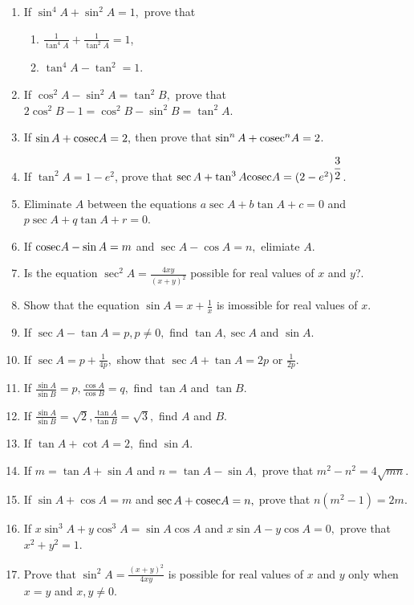 \begin{enumerate}
\item If $\sin^4 A + \sin^2 A = 1,$ prove that
  \begin{enumerate}
    \item $\frac{1}{\tan^4 A} + \frac{1}{\tan^2A} = 1$,
    \item $\tan^4A - \tan^2 = 1$.
  \end{enumerate}
\item If $\cos^2A - \sin^2 A = \tan^2 B,$ prove that $2\cos^2B - 1 = \cos^2B - \sin^2B = \tan^2A$.
\item If $\sin A + {\rm cosec} A = 2,$ then prove that $\sin^nA + {\rm cosec}^nA = 2$.
\item If $\tan^2A = 1 - e^2$, prove that $\sec A + \tan^3A {\rm cosec}A = (2 - e^2)^{\frac{3}{2}}$.
\item Eliminate $A$ between the equations $a\sec A + b\tan A + c = 0$ and $p\sec A + q\tan A + r = 0$.
\item If ${\rm cosec} A - \sin A = m$ and $\sec A - \cos A = n,$ elimiate $A$.
\item Is the equation $\sec^2 A = \frac{4xy}{(x + y)^2}$ possible for real values of $x$ and $y$?.
\item Show that the equation $\sin A = x + \frac{1}{x}$ is imossible for real values of $x$.
\item If $\sec A - \tan A = p, p\neq 0,$ find $\tan A, \sec A$ and $\sin A$.
\item If $\sec A = p + \frac{1}{4p},$ show that $\sec A + \tan A = 2p$ or $\frac{1}{2p}$.
\item If $\frac{\sin A}{\sin B} = p, \frac{\cos A}{\cos B} = q,$ find $\tan A$ and $\tan B$.
\item If $\frac{\sin A}{\sin B} = \sqrt{2}, \frac{\tan A}{\tan B}= \sqrt{3},$ find $A$ and $B$.
\item If $\tan A + \cot A = 2,$ find $\sin A$.
\item If $m = \tan A + \sin A$ and $n = \tan A - \sin A,$ prove that $m^2 - n^2 = 4\sqrt{mn}$.
\item If $\sin A + \cos A = m$ and $\sec A + {\rm cosec} A = n,$ prove that $n(m^2 - 1) = 2m$.
\item If $x\sin^3 A + y\cos^3 A = \sin A\cos A$ and $x\sin A - y\cos A = 0,$ prove that $x^2 + y^2 = 1$.
\item Prove that $\sin^2A = \frac{(x + y)^2}{4xy}$ is possible for real values of $x$ and $y$ only when $x =
    y$ and $x,y \neq 0$.
\end{enumerate}
